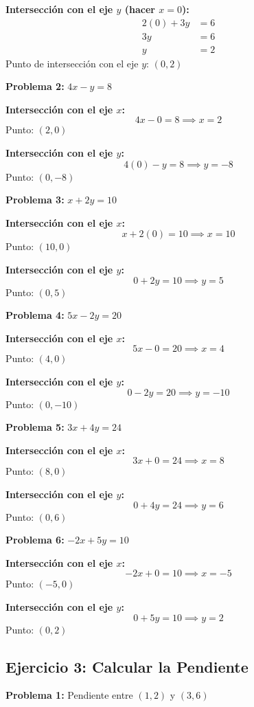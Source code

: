 \textbf{Intersección con el eje $y$ (hacer $x = 0$):}
\begin{align*}
2(0) + 3y &= 6 \\
3y &= 6 \\
y &= 2
\end{align*}
Punto de intersección con el eje $y$: $(0, 2)$

\medskip

\textbf{Problema 2:} $4x - y = 8$

\textbf{Intersección con el eje $x$:}
$$4x - 0 = 8 \implies x = 2$$
Punto: $(2, 0)$

\textbf{Intersección con el eje $y$:}
$$4(0) - y = 8 \implies y = -8$$
Punto: $(0, -8)$

\medskip

\textbf{Problema 3:} $x + 2y = 10$

\textbf{Intersección con el eje $x$:}
$$x + 2(0) = 10 \implies x = 10$$
Punto: $(10, 0)$

\textbf{Intersección con el eje $y$:}
$$0 + 2y = 10 \implies y = 5$$
Punto: $(0, 5)$

\medskip

\textbf{Problema 4:} $5x - 2y = 20$

\textbf{Intersección con el eje $x$:}
$$5x - 0 = 20 \implies x = 4$$
Punto: $(4, 0)$

\textbf{Intersección con el eje $y$:}
$$0 - 2y = 20 \implies y = -10$$
Punto: $(0, -10)$

\medskip

\textbf{Problema 5:} $3x + 4y = 24$

\textbf{Intersección con el eje $x$:}
$$3x + 0 = 24 \implies x = 8$$
Punto: $(8, 0)$

\textbf{Intersección con el eje $y$:}
$$0 + 4y = 24 \implies y = 6$$
Punto: $(0, 6)$

\medskip

\textbf{Problema 6:} $-2x + 5y = 10$

\textbf{Intersección con el eje $x$:}
$$-2x + 0 = 10 \implies x = -5$$
Punto: $(-5, 0)$

\textbf{Intersección con el eje $y$:}
$$0 + 5y = 10 \implies y = 2$$
Punto: $(0, 2)$

\newpage

\subsection*{Ejercicio 3: Calcular la Pendiente}

\textbf{Problema 1:} Pendiente entre $(1, 2)$ y $(3, 6)$

